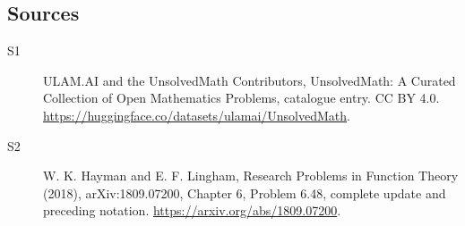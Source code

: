 \documentclass[11pt]{article}
\begin{document}
\subsection{Sources}
\begin{description}
\item[\hypertarget{source:statement:1}{S1}] ULAM.AI and the UnsolvedMath Contributors, UnsolvedMath: A Curated Collection of Open Mathematics Problems, catalogue entry. CC BY 4.0. \url{https://huggingface.co/datasets/ulamai/UnsolvedMath}.
\item[\hypertarget{source:statement:2}{S2}] W. K. Hayman and E. F. Lingham, Research Problems in Function Theory (2018), arXiv:1809.07200, Chapter 6, Problem 6.48, complete update and preceding notation. \url{https://arxiv.org/abs/1809.07200}.
\end{description}
\label{end:statement}
\end{document}

